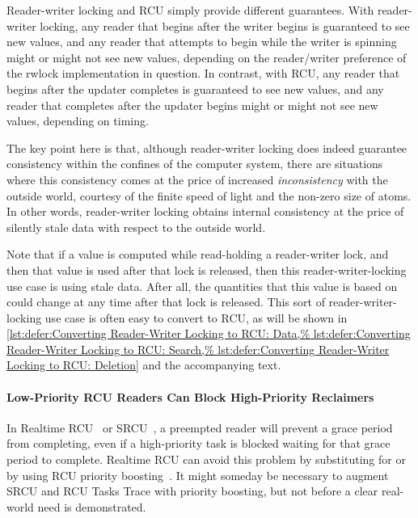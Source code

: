 Reader-writer locking and RCU simply provide different guarantees.
With reader-writer locking, any reader that begins after the writer begins
is guaranteed to see new values, and any reader that attempts to
begin while the writer is spinning might or might not see new values,
depending on the reader/writer preference of the rwlock implementation in
question.
In contrast, with RCU, any reader that begins after the updater completes
is guaranteed to see new values, and any reader that completes after the
updater begins might or might not see new values, depending on timing.

The key point here is that, although reader-writer locking does
indeed guarantee consistency within the confines of the computer system,
there are situations where this consistency comes at the price of
increased \emph{inconsistency} with the outside world, courtesy of
the finite speed of light and the non-zero size of atoms.
In other words, reader-writer locking obtains internal consistency at the
price of silently stale data with respect to the outside world.

Note that if a value is computed while read-holding a reader-writer
lock, and then that value is used after that lock is released, then
this reader-writer-locking use case is using stale data.
After all, the quantities that this value is based on could change
at any time after that lock is released.
This sort of reader-writer-locking use case is often easy to
convert to RCU, as will be shown in
\cref{lst:defer:Converting Reader-Writer Locking to RCU: Data,%
lst:defer:Converting Reader-Writer Locking to RCU: Search,%
lst:defer:Converting Reader-Writer Locking to RCU: Deletion}
and the accompanying text.

\paragraph{Low-Priority RCU Readers Can Block High-Priority Reclaimers}

In Realtime RCU~\cite{DinakarGuniguntala2008IBMSysJ} or
SRCU~\cite{PaulEMcKenney2006c},
a preempted reader will prevent a grace period from completing, even if
a high-priority task is blocked waiting for that grace period to complete.
Realtime RCU can avoid this problem by substituting 
for  or by using RCU priority
boosting~\cite{PaulEMcKenney2007BoostRCU,DinakarGuniguntala2008IBMSysJ}.
It might someday be necessary to augment SRCU and RCU Tasks Trace with
priority boosting, but not before a clear real-world need is demonstrated.

